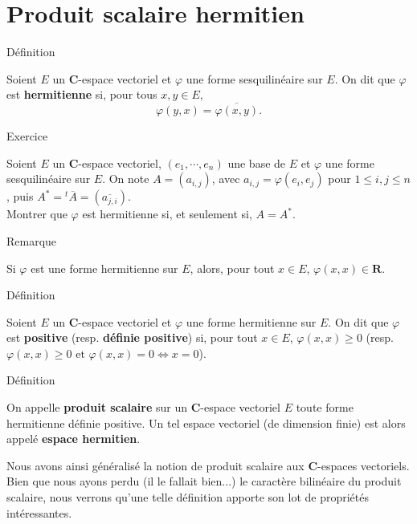 \documentclass[a4paper,11pt]{article}
\newcommand{\R}{\mathbf{R}}
\newcommand{\C}{\mathbf{C}}
\newenvironment{gbar}[1]{%
		\def\FrameCommand{{\color{#1}\vrule width 3pt }
		\colorbox{gris2}} %
		\MakeFramed{\advance\hsize -\width\FrameRestore}} %
		{\endMakeFramed}
\newenvironment{cadre}[2]{
		\begin{bclogo}[couleur = gris , barre = none , noborder = true , logo=\vspace{1em}]{
			\hspace{.14em}
			\colorbox{#1}{
				\parbox{15em}{
				\sffamily\normalsize{\color{gris}#2}
			}}
			\vspace{.2em}
		}
			\begin{gbar}{#1}
	}
	{
			\end{gbar}
		\end{bclogo}
	}
\begin{document}
\section{Produit scalaire hermitien}

\begin{cadre}{bleu}{Définition}
Soient $E$ un $\C$-espace vectoriel et $\varphi$ une forme sesquilinéaire sur $E$. On dit que $\varphi$ est {\sffamily\textbf{\color{bleu}hermitienne}} si, pour tous $x,y\in E$,
\[\varphi(y,x)=\overline{\varphi(x,y)}.\]
\end{cadre}

\begin{cadre}{jaune}{Exercice}
Soient $E$ un $\C$-espace vectoriel, $(e_1,\cdots,e_n)$ une base de $E$ et $\varphi$ une forme sesquilinéaire sur $E$. On note $A=\left(a_{i,j}\right)$, avec $a_{i,j}=\varphi\left(e_i,e_j\right)$ pour $1\leq i,j\leq n$, puis $A^*={}^t\overline{A}=\left(\overline{a_{j,i}}\right)$.\\

Montrer que $\varphi$ est hermitienne si, et seulement si, $A=A^*$.
\end{cadre}

\begin{cadre}{noir}{Remarque}
Si $\varphi$ est une forme hermitienne sur $E$, alors, pour tout $x\in E$, $\varphi(x,x)\in\R$.
\end{cadre}

\begin{cadre}{bleu}{Définition}
Soient $E$ un $\C$-espace vectoriel et $\varphi$ une forme hermitienne sur $E$. On dit que $\varphi$ est {\sffamily\textbf{\color{bleu}positive}} (resp. {\sffamily\textbf{\color{bleu} définie positive}}) si, pour tout $x\in E$,
$\varphi(x,x)\geq 0$ (resp. $\varphi(x,x)\geq 0\text{ et } \varphi(x,x)=0\Leftrightarrow x=0$).
\end{cadre}

\begin{cadre}{bleu}{Définition}
On appelle {\sffamily\textbf{\color{bleu} produit scalaire}} sur un $\C$-espace vectoriel $E$ toute forme hermitienne définie positive. Un tel espace vectoriel (de dimension finie) est alors appelé {\sffamily\textbf{\color{bleu} espace hermitien}}.
\end{cadre}
Nous avons ainsi généralisé la notion de produit scalaire aux $\C$-espaces vectoriels. Bien que nous ayons perdu (il le fallait bien...) le caractère bilinéaire du produit scalaire, nous verrons qu'une telle définition apporte son lot de propriétés intéressantes.
\end{document}
